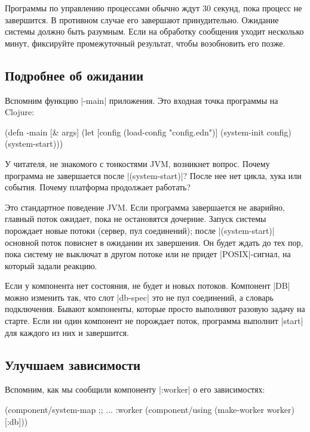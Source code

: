 Программы по управлению процессами обычно ждут 30 секунд, пока процесс не
завершится. В противном случае его завершают принудительно. Ожидание системы
должно быть разумным. Если на обработку сообщения уходит несколько минут,
фиксируйте промежуточный результат, чтобы возобновить его позже.

\subsection{Подробнее об ожидании}

Вспомним функцию \spverb|-main| приложения. Это входная точка программы на
Clojure:

\begin{english}
  \begin{clojure}
(defn -main [& args]
  (let [config (load-config "config.edn")]
    (system-init config)
    (system-start)))
  \end{clojure}
\end{english}

У читателя, не знакомого с тонкостями JVM, возникнет вопрос. Почему программа не
завершается после \spverb|(system-start)|? После нее нет цикла, хука или
события. Почему платформа продолжает работать?

Это стандартное поведение JVM. Если программа завершается не аварийно, главный
поток ожидает, пока не остановятся дочерние. Запуск системы порождает новые
потоки (сервер, пул соединений); после \spverb|(system-start)| основной поток
повиснет в ожидании их завершения. Он будет ждать до тех пор, пока систему не
выключат в другом потоке или не придет \spverb|POSIX|-сигнал, на который задали
реакцию.

Если у компонента нет состояния, не будет и новых потоков. Компонент \spverb|DB|
можно изменить так, что слот \spverb|db-spec| это не пул соединений, а словарь
подключения. Бывают компоненты, которые просто выполняют разовую задачу на
старте. Если ни один компонент не порождает поток, программа выполнит
\spverb|start| для каждого из них и завершится.

\subsection{Улучшаем зависимости}

Вспомним, как мы сообщили компоненту \spverb|:worker| о его зависимостях:

\begin{english}
  \begin{clojure}
(component/system-map
 ;; ...
 :worker (component/using
          (make-worker worker) [:db]))
  \end{clojure}
\end{english}

